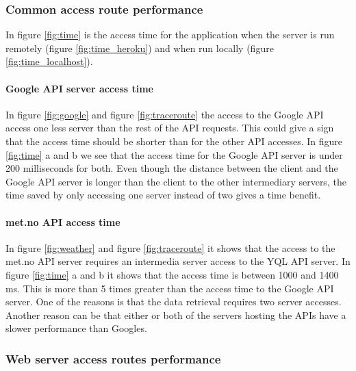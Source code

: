 \documentclass[10pt,a4paper]{article}
\begin{document}
\subsubsection{Common access route performance}
In figure \ref{fig:time} is the access time for the application when the server is run remotely (figure \ref{fig:time_heroku}) and when run locally (figure \ref{fig:time_localhost}). 

\paragraph{Google API server access time} 
In figure \ref{fig:google} and figure \ref{fig:traceroute} the access to the Google API access one less server than the rest of the API requests. This could give a sign that the access time should be shorter than for the other API accesses. In figure \ref{fig:time} a and b we see that the access time for the Google API server is under 200 milliseconds for both. Even though the distance between the client and the Google API server is longer than the client to the other intermediary servers, the time saved by only accessing one server instead of two gives a time benefit.

\paragraph{met.no API access time} 
In figure \ref{fig:weather} and figure \ref{fig:traceroute} it shows that the access to the met.no API server requires an intermedia server access to the YQL API server. In figure \ref{fig:time} a and b it shows that the access time is between 1000 and 1400 ms. This is more than 5 times greater than the access time to the Google API server. One of the reasons is that the data retrieval requires two server accesses. Another reason can be that either or both of the servers hosting the APIs have a slower performance than Googles.

\subsubsection{Web server access routes performance}
\end{document}

